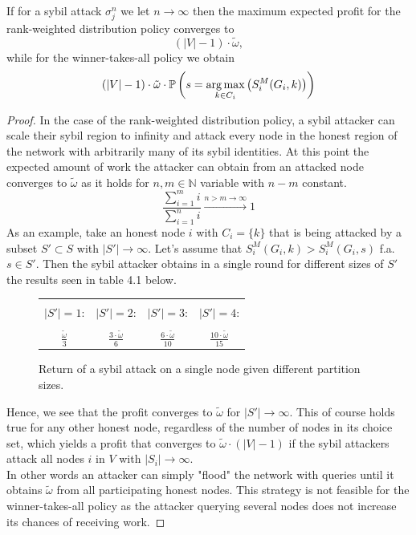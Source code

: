 \begin{proposition}[]\ \\
\label{prop:Distribution vs. Winner-takes-all when scaled}
\noindent{}If for a sybil attack $\sigma_j^n$ we let $n\rightarrow\infty$ then the maximum expected profit for the rank-weighted distribution policy converges to 
\[
\left(|V|-1\right)\cdot\tilde{\omega},
\]while for the winner-takes-all policy we obtain 
\[
\left(|V|-1\right)\cdot\tilde{\omega}\cdot\mathbb{P}\left(s=\operatorname*{arg\,max}\limits_{k\in{}C_i}\left(S_i^M(G_i,k)\right)\right)
\]
\end{proposition}
\begin{proof}
\noindent{}In the case of the rank-weighted distribution policy, a sybil attacker can scale their sybil region to infinity and attack every node in the honest region of the network with arbitrarily many of its sybil identities. At this point the expected amount of work the attacker can obtain from an attacked node converges to $\tilde{\omega}$ as it holds for $n,m\in\mathbb{N}$ variable with $n-m$ constant.
\[
\frac{\sum\limits_{i=1}^{m}i}{\sum\limits_{i=1}^{n}i}\xrightarrow{n>m\rightarrow\infty}1
\]
\noindent{}As an example, take an honest node $i$ with $C_i=\lbrace{}k\rbrace$ that is being attacked by a subset $S'\subset{}S$ with $|S'|\rightarrow\infty$. Let's assume that $S^M_i(G_i,k)>S^M_i(G_i,s)$ f.a. $s\in{}S'$. Then the sybil attacker obtains in a single round for different sizes of $S'$ the results seen in table 4.1 below.

\begin{figure}[H]
\begin{center}
\begin{tabular}{|c|c|c|c|}
\hline & & & \\[-0.7ex] $|S'|=1$: & $|S'|=2$: & $|S'|=3$: & $|S'|=4$: \\[1.5ex] \hline & & & \\[-0.7ex]
$\frac{\tilde{\omega}}{3}$ & $\frac{3\cdot\tilde{\omega}}{6}$ & $\frac{6\cdot\tilde{\omega}}{10}$ & $\frac{10\cdot\tilde{\omega}}{15}$ \\[1ex]\hline
\end{tabular}
\end{center}
\label{fig:Sybil Attack Partitions}
\caption{Return of a sybil attack on a single node given different partition sizes.}
\end{figure}

\noindent{}Hence, we see that the profit converges to $\tilde{\omega}$ for $|S'|\rightarrow\infty$. This of course holds true for any other honest node, regardless of the number of nodes in its choice set, which yields a profit that converges to $\tilde{\omega}\cdot\left(|V|-1\right)$ if the sybil attackers attack all nodes $i$ in $V$ with $|S_i|\rightarrow\infty$. \vspace{1em}\\

\noindent{}In other words an attacker can simply "flood" the network with queries until it obtains $\tilde{\omega}$ from all participating honest nodes. This strategy is not feasible for the winner-takes-all policy as the attacker querying several nodes does not increase its chances of receiving work. 
\end{proof}

